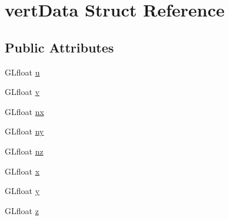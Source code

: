 \hypertarget{structvertData}{
\section{vertData Struct Reference}
\label{structvertData}
}
\subsection*{Public Attributes}
\begin{DoxyCompactItemize}
\item 
GLfloat \hyperlink{structvertData_ad1f8816dd0192f6879c4ee9bff6c700a}{u}
\item 
GLfloat \hyperlink{structvertData_ad7a3ddf9fe3f9ff3c6aa7a0fe1b58ac7}{v}
\item 
GLfloat \hyperlink{structvertData_a87b6866bae90a9617864ca1e582f3ca7}{nx}
\item 
GLfloat \hyperlink{structvertData_a1804a6e90a3bc8db100fca75182b669b}{ny}
\item 
GLfloat \hyperlink{structvertData_afe3e017da8c74b4ec972a7bff44be3d4}{nz}
\item 
GLfloat \hyperlink{structvertData_a9f2687edf1fb3cf42ab1631b4d2fb088}{x}
\item 
GLfloat \hyperlink{structvertData_aa95cc4d9dc894a522dff1bbf8cbf6824}{y}
\item 
GLfloat \hyperlink{structvertData_a1e486c5488cdc3bb79302cb8c088a665}{z}
\end{DoxyCompactItemize}



